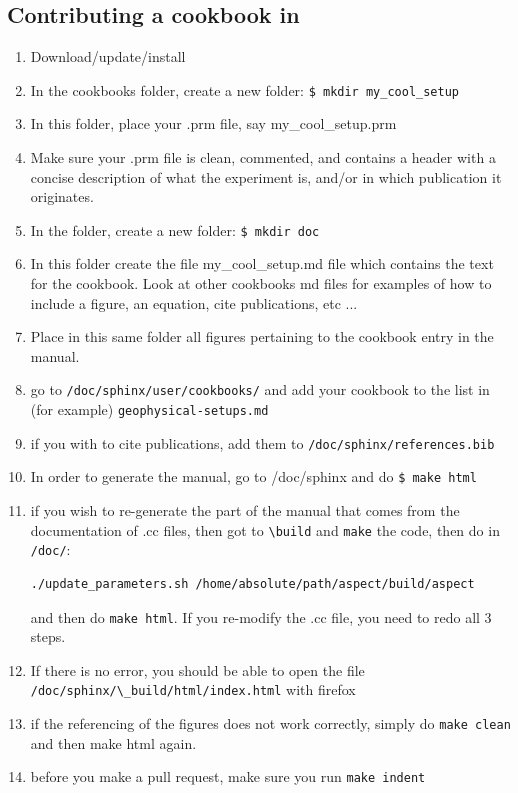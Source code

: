 \newpage




\newpage

\subsection{Contributing a cookbook in \aspect}

\begin{enumerate}
\item Download/update/install \aspect 
\item In the cookbooks folder, create a new folder: \verb'$ mkdir my_cool_setup'
\item In this folder, place your .prm file, say my\_cool\_setup.prm
\item Make sure your .prm file is clean, commented, and contains a header with a concise
description of what the experiment is, and/or in which publication it originates.
\item In the folder, create a new folder:  \verb'$ mkdir doc'
\item In this folder create the file my\_cool\_setup.md file which contains the 
text for the cookbook. Look at other cookbooks md files for examples of how 
to include a figure, an equation, cite publications, etc ...
\item Place in this same folder all figures pertaining 
to the cookbook entry in the manual. 
\item go to \verb'/doc/sphinx/user/cookbooks/' and add your cookbook to the list in 
(for example) \verb'geophysical-setups.md'
\item if you with to cite publications, add them to \verb'/doc/sphinx/references.bib'
\item In order to generate the manual, go to /doc/sphinx and do \verb"$ make html"

\item if you wish to re-generate the part of the manual that comes from the documentation
of .cc files, then got to \verb'\build' and \verb'make' the code, then do in \verb'/doc/': 
\begin{verbatim}
./update_parameters.sh /home/absolute/path/aspect/build/aspect
\end{verbatim}
and then do \verb'make html'. If you re-modify the .cc file, you need to redo all 3 steps.

\item If there is no error, you should be able to open the file \verb'/doc/sphinx/\_build/html/index.html'
with firefox
\item if the referencing of the figures does not work correctly, simply do 
\verb'make clean' and then make html again.
\item before you make a pull request, make sure you run \verb'make indent'
\end{enumerate}



